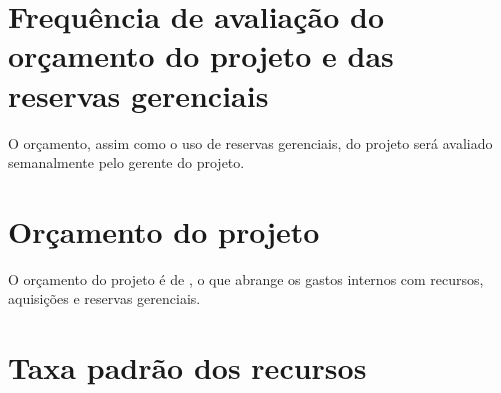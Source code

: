 \section{Frequência de avaliação do orçamento do projeto e das reservas gerenciais}

O orçamento, assim como o uso de reservas gerenciais, do projeto será avaliado semanalmente pelo gerente do projeto.

\section{Orçamento do projeto}

O orçamento do projeto é de \realBudget{}, o que abrange os gastos internos com recursos, aquisições e reservas gerenciais.

\section{Taxa padrão dos recursos}

